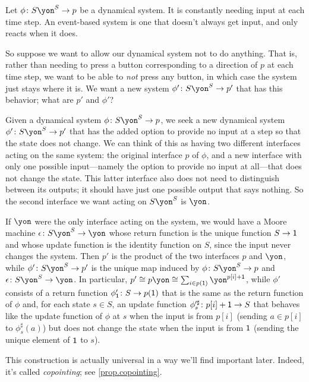 \documentclass[Book-Poly]{subfiles}
\begin{document}
\begin{exercise}
Let $\phi\colon S\yon^S\to p$ be a dynamical system. It is constantly needing input at each time step. An event-based system is one that doesn't always get input, and only reacts when it does.

So suppose we want to allow our dynamical system not to do anything. That is, rather than needing to press a button corresponding to a direction of $p$ at each time step, we want to be able to \emph{not} press any button, in which case the system just stays where it is. We want a new system $\phi'\colon S\yon^S\to p'$ that has this behavior; what are $p'$ and $\phi'$?
\begin{solution}
Given a dynamical system $\phi\colon S\yon^S\to p$, we seek a new dynamical system $\phi'\colon S\yon^S\to p'$ that has the added option to provide no input at a step so that the state does not change.
We can think of this as having two different interfaces acting on the same system: the original interface $p$ of $\phi$, and a new interface with only one possible input---namely the option to provide no input at all---that does not change the state.
This latter interface also does not need to distinguish between its outputs; it should have just one possible output that says nothing.
So the second interface we want acting on $S\yon^S$ is $\yon$.

If $\yon$ were the only interface acting on the system, we would have a Moore machine $\epsilon\colon S\yon^S\to\yon$ whose return function is the unique function $S \to \textsf{1}$ and whose update function is the identity function on $S$, since the input never changes the system.
Then $p'$ is the product of the two interfaces $p$ and $\yon$, while $\phi'\colon S\yon^S \to p'$ is the unique map induced by $\phi\colon S\yon^S\to p$ and $\epsilon\colon S\yon^S\to\yon$.
In particular, $p'\iso p\yon\iso\sum_{i\in p(\1)}\yon^{p[i]+\1}$, while $\phi'$ consists of a return function $\phi'_{\textsf{1}}\colon S \to p(\textsf{1})$ that is the same as the return function of $\phi$ and, for each state $s\in S$, an update function $\phi'^\sharp_s\colon p[i]+\textsf{1}\to S$ that behaves like the update function of $\phi$ at $s$ when the input is from $p[i]$ (sending $a\in p[i]$ to $\phi^\sharp_s(a)$) but does not change the state when the input is from $\textsf{1}$ (sending the unique element of $\textsf{1}$ to $s$).

This construction is actually universal in a way we'll find important later. Indeed, it's called \emph{copointing}; see \cref{prop.copointing}.
\end{solution}
\end{exercise}
\end{document}
